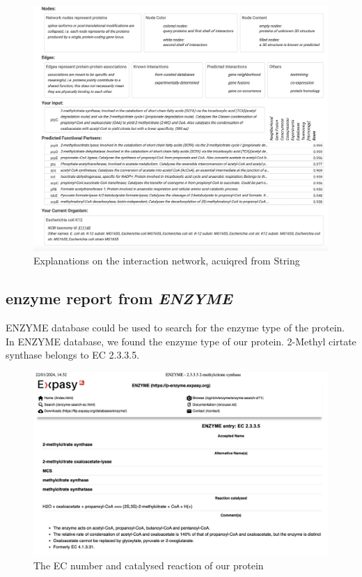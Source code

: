\documentclass[a4paper,english,12pt,bibliography=totoc]{scrreprt}
\begin{document}
\begin{figure}[H]
    \centering
    \includegraphics[width=0.9\linewidth]{Project 2/Images from Rhea and String/string 2.png}
    \caption{Explanations on the interaction network, acuiqred from String}
\end{figure}

\subsection{enzyme report from \textit{ENZYME}}
ENZYME database could be used to search for the enzyme type of the protein. In ENZYME database, we found the enzyme type of our protein. 2-Methyl cirtate synthase belongs to EC 2.3.3.5. 
\begin{figure}[H]
    \centering
    \includegraphics[width=0.9\linewidth]{Project 2/ENZYME images/Enzyme.png}
    \caption{The EC number and catalysed reaction of our protein}
\end{figure}
\end{document}
